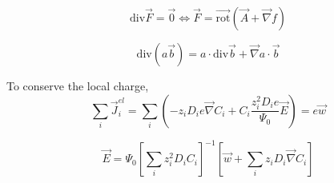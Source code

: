 \documentclass[aps,12pt]{revtex4}
\begin{document}
\begin{equation}
	\mathrm{div} \vec{F} = \vec{0} \Leftrightarrow \vec{F} = \vec{\mathrm{rot}} (\vec{A} + \vec{\nabla} f)
\end{equation}

\begin{equation}
	\mathrm{div} (a\vec{b}) = a \cdot \mathrm{div} \vec{b} + \vec{\nabla}a \cdot \vec{b}
\end{equation}

To conserve the local charge,
\begin{equation}
	\sum_i \vec{J}^{el}_i = \sum_i\left( - z_i D_i e  \vec{\nabla} C_i + C_i \dfrac{z_i^2 D_i e}{\Psi_0}  \vec{E} \right) = e\vec{w}
\end{equation}

\begin{equation}
	\vec{E} = \Psi_0 \left[ \sum_i z_i^2 D_i C_i  \right]^{-1} \left[ \vec{w} + \sum_i z_i D_i \vec{\nabla} C_i \right]
\end{equation}
\end{document}
